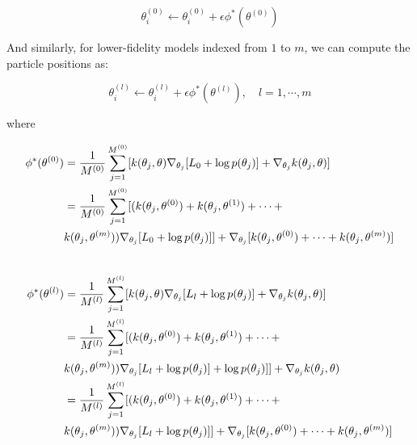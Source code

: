 \documentclass[12pt]{article}
\renewcommand{\[}{\left[}
\renewcommand{\]}{\right]}
\renewcommand{\(}{\left(}
\renewcommand{\)}{\right)}
\newcommand{\grad}[1]{\nabla #1}
\begin{document}
\begin{equation*}
    \theta^{(0)}_i \leftarrow \theta^{(0)}_i + \epsilon \phi^{\ast}(\theta^{(0)})
\end{equation*}

And similarly, for lower-fidelity models indexed from $1$ to $m$, we can compute the particle positions as:

\begin{equation*}
    \theta^{(l)}_i \leftarrow \theta^{(l)}_i + \epsilon \phi^{\ast}(\theta^{(l)}), \quad l=1, \cdots, m
\end{equation*}

where

\begin{align}
    \phi^{\ast}(\theta^{(0)}) &= \frac{1}{M^{(0)}}\sum_{j=1}^{M^{(0)}}[k(\theta_j, \theta) \grad_{\theta_j}[L_{0} + \log p(\theta_j)] + \grad_{\theta_j} k(\theta_j, \theta)] \\
    &= \frac{1}{M^{(0)}}\sum_{j=1}^{M^{(0)}}[(k(\theta_j, \theta^{(0)})  + k(\theta_j, \theta^{(1)}) + \cdots + \nonumber\\ 
    &k(\theta_j, \theta^{(m)})) \grad_{\theta_j}[L_{0} + \log p(\theta_j)]] + \grad_{\theta_j} [k(\theta_j, \theta^{(0)}) + \cdots + k(\theta_j, \theta^{(m)})]\\ \nonumber
\end{align}

\begin{align}
    \phi^{\ast}(\theta^{(l)}) &= \frac{1}{M^{(l)}}\sum_{j=1}^{M^{(l)}}[k(\theta_j, \theta) \grad_{\theta_j}[L_{l} + \log p(\theta_j)] + \grad_{\theta_j} k(\theta_j, \theta)] \\
    &= \frac{1}{M^{(l)}}\sum_{j=1}^{M^{(l)}}[(k(\theta_j, \theta^{(0)})  + k(\theta_j, \theta^{(1)}) + \cdots + \nonumber \\
    &k(\theta_j, \theta^{(m)})) \grad_{\theta_j}[L_{l} + \log p(\theta_j)] + \log p(\theta_j)]] + \grad_{\theta_j} k(\theta_j, \theta) \nonumber \\ 
    &= \frac{1}{M^{(l)}}\sum_{j=1}^{M^{(l)}}[(k(\theta_j, \theta^{(0)})  + k(\theta_j, \theta^{(1)}) + \cdots + \nonumber\\ 
    &k(\theta_j, \theta^{(m)})) \grad_{\theta_j}[L_{l} + \log p(\theta_j)]] + \grad_{\theta_j} [k(\theta_j, \theta^{(0)}) + \cdots + k(\theta_j, \theta^{(m)})]\\ \nonumber
\end{align}
\end{document}
